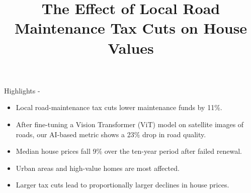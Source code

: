 \documentclass[12pt,halfline,a4paper]{ouparticle}
\begin{document}
\title{The Effect of Local Road Maintenance Tax Cuts on House Values}

\author{%
    \address{University of Cincinnati, Economics, Cincinnati, Ohio}
    \and
    \address{University of Cincinnati, Economics, Cincinnati, Ohio}
    }

\maketitle

Highlights - 

\begin{itemize}
    \item Local road-maintenance tax cuts lower maintenance funds by 11\%.
    \item After fine-tuning a Vision Transformer (ViT) model on satellite images of roads, our AI-based metric shows a 23\% drop in road quality.
    \item Median house prices fall 9\% over the ten-year period after failed renewal.
    \item Urban areas and high-value homes are most affected.
    \item Larger tax cuts lead to proportionally larger declines in house prices.
\end{itemize}

\pagebreak
\end{document}
